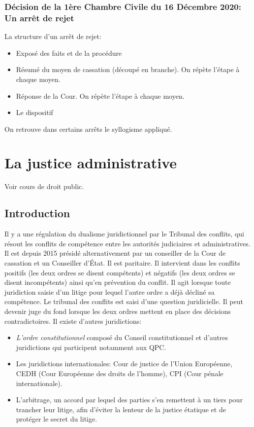 \documentclass[math]{cours}
\begin{document}
\subsubsection{Décision de la 1ère Chambre Civile du 16 Décembre 2020: Un arrêt de rejet}
La structure d'un arrêt de rejet:
\begin{itemize}
	\item Exposé des faits et de la procédure
	\item Résumé du moyen de cassation (découpé en branche). On répète l'étape à chaque moyen.
	\item Réponse de la Cour. On répète l'étape à chaque moyen.
	\item Le dispositif
\end{itemize}
On retrouve dans certains arrêts le syllogisme appliqué.

\section{La justice administrative}
Voir cours de droit public.
\subsection{Introduction}
Il y a une régulation du dualisme juridictionnel par le Tribunal des conflits, qui résout les conflits de compétence entre les autorités judiciaires et administratives.
Il est depuis 2015 présidé alternativement par un conseiller de la Cour de cassation et un Conseiller d'État. Il est paritaire.
Il intervient dans les conflits positifs (les deux ordres se disent compétents) et négatifs (les deux ordres se disent incompétents) ainsi qu'en prévention du conflit.
Il agit lorsque toute juridiction saisie d'un litige pour lequel l'autre ordre a déjà décliné sa compétence.
Le tribunal des conflits est saisi d'une question juridicielle.
Il peut devenir juge du fond lorsque les deux ordres mettent en place des décisions contradictoires.
Il existe d'autres juridictions:
\begin{itemize}
	\item \emph{L'ordre constitutionnel} composé du Conseil constitutionnel et d'autres juridictions qui participent notamment aux QPC.
	\item Les juridictions internationales: Cour de justice de l'Union Européenne, CEDH (Cour Européenne des droits de l'homme), CPI (Cour pénale internationale).
	\item L'arbitrage, un accord par lequel des parties s'en remettent à un tiers pour trancher leur litige, afin d'éviter la lenteur de la justice étatique et de protéger le secret du litige.
\end{itemize}
\end{document}
